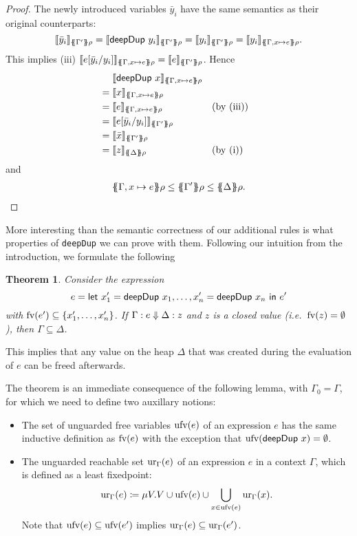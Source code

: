\documentclass[preprint]{sigplanconf}
\newtheorem{theorem}{Theorem}
\theoremstyle{nonumberplain}
\newtheorem{proof}{Proof}
\newcommand{\li}{\lstinline[style=Haskell]}
\begin{document}
\begin{proof}
The newly introduced variables $\bar y_i$ have the same semantics as their original counterparts:
\[
\dsem{\bar y_i}{\esem{\Gamma'}\rho}
= \dsem{\sDeepDup {y_i}}{\esem{\Gamma'}\rho}
= \dsem{y_i}{\esem{\Gamma'}\rho}
= \dsem{y_i}{\esem{\Gamma, x\mapsto e}\rho}.
\]
This implies (iii) $\dsem{e[\bar y_i/y_i]}{\esem{\Gamma, x\mapsto e}\rho} = \dsem{e}{\esem{\Gamma'}\rho}$. Hence
\begin{align*}
&\phantom{{}={}}\dsem{\sDeepDup x}{\esem{\Gamma, x\mapsto e}\rho}\\
&= \dsem{x}{\esem{\Gamma, x\mapsto e}\rho}\\
&= \dsem{e}{\esem{\Gamma, x\mapsto e}\rho} &&\text{(by (iii))}\\
&= \dsem{e[\bar y_i/y_i]}{\esem{\Gamma'}\rho}\\
&= \dsem{\bar x}{\esem{\Gamma'}\rho}\\
&= \dsem{z}{\esem \Delta \rho} &&\text{(by (i))}
\end{align*}
and
\begin{align*}
\esem{\Gamma, x\mapsto e}\rho \le \esem{\Gamma'} \rho \le \esem{\Delta}\rho.
\end{align*}
\end{proof}

More interesting than the semantic correctness of our additional rules is what properties of \li-deepDup- we can prove with them. Following our intuition from the introduction, we formulate the following
\begin{theorem}
Consider the expression
\[
e=\text{\textsf{let}}\ x_1' = \text{\textsf{deepDup}}\ x_1,\ldots,x_n'= \text{\textsf{deepDup}}\ x_n\ \text{\textsf{in}}\ e'
\]
with $\text{fv}(e') \subseteq \{x_1',\ldots,x_n'\}$. If $\Gamma : e \Downarrow \Delta : z$ and $z$ is a closed value (i.e.\ $\text{fv}(z) = \emptyset$), then $\Gamma \subseteq \Delta$.
\label{thm:deepdup}
\end{theorem}
This implies that any value on the heap $\Delta$ that was created during the evaluation of $e$ can be freed afterwards.

The theorem is an immediate consequence of the following lemma, with $\Gamma_0 = \Gamma$, for which we need to define two auxillary notions:
\begin{itemize}
\item 
The set of unguarded free variables $\text{ufv}(e)$ of an expression $e$ has the same inductive definition as $\text{fv}(e)$ with the exception that $\text{ufv}(\text{\textsf{deepDup}}\ x) = \emptyset$. 
\item The unguarded reachable set $\text{ur}_{\Gamma}(e)$ of an expression $e$ in a context $\Gamma$, which is defined as a least fixedpoint:
\[
\text{ur}_{\Gamma}(e) \coloneqq \mu V. V \cup \text{ufv}(e) \cup \bigcup_{x\in \text{ufv}(e)}\text{ur}_{\Gamma}(x).
\]
Note that $\text{ufv}(e) \subseteq \text{ufv}(e')$ implies $\text{ur}_{\Gamma}(e) \subseteq \text{ur}_{\Gamma}(e')$.
\end{itemize}
\end{document}
